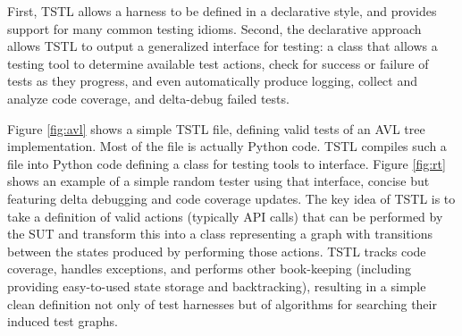\documentclass{sig-alternate}
\begin{document}
First, TSTL allows a harness to be defined in a declarative style,
and provides support for many common testing idioms.  Second, the
declarative approach allows TSTL to output a generalized interface for
testing:  a class that allows a testing tool to determine available
test actions, check for success or failure of tests as they progress,
and even automatically produce logging, collect and analyze code
coverage, and delta-debug failed tests.

Figure \ref{fig:avl} shows a simple TSTL file, defining valid tests of
an AVL tree implementation.  Most of the file is actually Python code.
TSTL compiles such a file into Python code defining a class for
testing tools to interface.  Figure \ref{fig:rt} shows an example of a
simple random tester using that interface, concise but featuring delta
debugging \cite{DD} and code coverage updates.  The key idea of TSTL is to
take a definition of valid actions (typically API calls) that can
be performed by the SUT and transform this into a class representing a
graph with transitions between the states produced by performing those
actions.  TSTL tracks code coverage, handles exceptions, and performs
other book-keeping (including providing easy-to-used state storage and
backtracking), resulting in a simple clean definition not only of
test harnesses but of algorithms for searching their induced test graphs.
\end{document}
